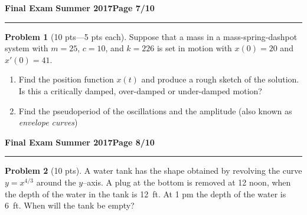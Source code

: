 \documentclass[12pt]{article}
\theoremstyle{definition}
\newtheorem{problem}{Problem}
\begin{document}
\hfill{\large\bf Final Exam}\hfill{\large\bf
Summer 2017}\hfill{\large\bf Page 7/10}\hrule

\bigskip
\begin{problem}[10 pts---5 pts each]
Suppose that a mass in a mass-spring-dashpot system with $m=25$, $c=10$, and $k=226$ is set in motion with $x(0)=20$ and $x'(0)=41$. 
\begin{enumerate}
  \item Find the position function $x(t)$ and produce a rough sketch of the solution.  Is this a critically damped, over-damped or under-damped motion?
  \vspace{4cm}
  \begin{flushright}
  \end{flushright}
  \item Find the pseudoperiod of the oscillations and the amplitude (also known as \emph{envelope curves})
  \vspace{12cm}
  \begin{flushright}
  \end{flushright}
\end{enumerate}
\end{problem}
\newpage

\hfill{\large\bf Final Exam}\hfill{\large\bf
Summer 2017}\hfill{\large\bf Page 8/10}\hrule

\bigskip
\begin{problem}[10 pts]
A water tank has the shape obtained by revolving the curve $y=x^{4/3}$ around the $y$--axis.  A plug at the bottom is removed at 12 noon, when the depth of the water in the tank is 12~ft.  At 1 pm the depth of the water is 6~ft.  When will the tank be empty?
\vspace{19cm}
\begin{flushright}
\end{flushright}
\end{problem}
\newpage
\end{document}
